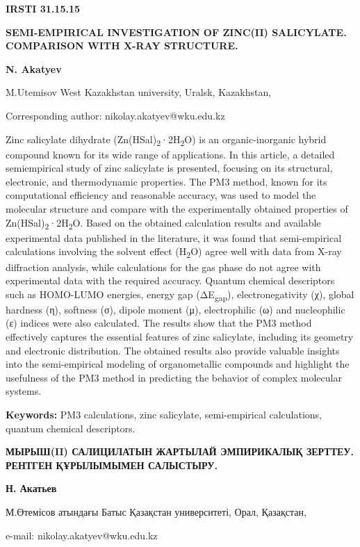 \newpage
{\bfseries IRSTI 31.15.15}

{\bfseries SEMI-EMPIRICAL INVESTIGATION OF ZINC(II) SALICYLATE. COMPARISON
WITH X-RAY STRUCTURE.}

{\bfseries N. Akatyev}

M.Utemisov West Kazakhstan university, Uralsk, Kazakhstan,

Corresponding author: nikolay.akatyev@wku.edu.kz

Zinc salicylate dihydrate
(Zn(HSal)\textsubscript{2}·2H\textsubscript{2}O) is an organic-inorganic
hybrid compound known for its wide range of applications. In this
article, a detailed semiempirical study of zinc salicylate is presented,
focusing on its structural, electronic, and thermodynamic properties.
The PM3 method, known for its computational efficiency and reasonable
accuracy, was used to model the molecular structure and compare with the
experimentally obtained properties of
Zn(HSal)\textsubscript{2}·2H\textsubscript{2}O. Based on the obtained
calculation results and available experimental data published in the
literature, it was found that semi-empirical calculations involving the
solvent effect (H\textsubscript{2}O) agree well with data from X-ray
diffraction analysis, while calculations for the gas phase do not agree
with experimental data with the required accuracy. Quantum chemical
descriptors such as HOMO-LUMO energies, energy gap
(ΔE\textsubscript{gap}), electronegativity (χ), global hardness (η),
softness (σ), dipole moment (μ), electrophilic (ω) and nucleophilic (ε)
indices were also calculated. The results show that the PM3 method
effectively captures the essential features of zinc salicylate,
including its geometry and electronic distribution. The obtained results
also provide valuable insights into the semi-empirical modeling of
organometallic compounds and highlight the usefulness of the PM3 method
in predicting the behavior of complex molecular systems.

{\bfseries Keywords:} PM3 calculations, zinc salicylate, semi-empirical
calculations, quantum chemical descriptors.

{\bfseries МЫРЫШ(II) САЛИЦИЛАТЫН ЖАРТЫЛАЙ ЭМПИРИКАЛЫҚ ЗЕРТТЕУ. РЕНТГЕН
ҚҰРЫЛЫМЫМЕН САЛЫСТЫРУ.}

{\bfseries Н. Акатьев}

М.Өтемісов атындағы Батыс Қазақстан университеті, Орал, Қазақстан,

e-mail: nikolay.akatyev@wku.edu.kz

